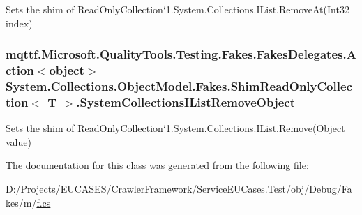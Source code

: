 Sets the shim of Read\-Only\-Collection`1.System.\-Collections.\-I\-List.\-Remove\-At(\-Int32 index)

\hypertarget{class_system_1_1_collections_1_1_object_model_1_1_fakes_1_1_shim_read_only_collection_3_01_t_01_4_a4e551ba686217657d8408804c8740978}{
\subsubsection[{System\-Collections\-I\-List\-Remove\-Object}]{\setlength{\rightskip}{0pt plus 5cm}mqttf.\-Microsoft.\-Quality\-Tools.\-Testing.\-Fakes.\-Fakes\-Delegates.\-Action$<$object$>$ System.\-Collections.\-Object\-Model.\-Fakes.\-Shim\-Read\-Only\-Collection$<$ T $>$.System\-Collections\-I\-List\-Remove\-Object\hspace{0.3cm}{\ttfamily [set]}}}\label{class_system_1_1_collections_1_1_object_model_1_1_fakes_1_1_shim_read_only_collection_3_01_t_01_4_a4e551ba686217657d8408804c8740978}


Sets the shim of Read\-Only\-Collection`1.System.\-Collections.\-I\-List.\-Remove(\-Object value)



The documentation for this class was generated from the following file\-:\begin{DoxyCompactItemize}
\item 
D\-:/\-Projects/\-E\-U\-C\-A\-S\-E\-S/\-Crawler\-Framework/\-Service\-E\-U\-Cases.\-Test/obj/\-Debug/\-Fakes/m/\hyperlink{m_2f_8cs}{f.\-cs}\end{DoxyCompactItemize}
